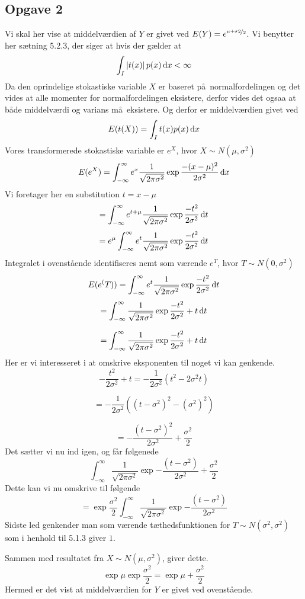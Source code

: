 \subsection{Opgave 2}
Vi skal her vise at middelv\ae rdien af $Y$ er givet ved $E(Y) = e^{\nicefrac{\mu+\sigma2}{2}}$. Vi benytter her s\ae tning 5.2.3, der siger at hvis der g\ae lder at
\[
\int_{I} \left|t(x)\right|p(x) \, \mathrm{d} x < \infty
\]
Da den oprindelige stokastiske variable $X$ er baseret p\aa\ normalfordelingen og det vides at alle momenter for normalfordelingen eksistere, derfor vides det ogsaa at b\aa de middelv\ae rdi og varians m\aa\ eksistere. Og derfor er middelv\ae rdien givet ved
\[
E(t(X)) = \int_{I} t(x)p(x) \, \mathrm{d} x
\]
Vores transformerede stokastiske variable er $e^{X}$, hvor $X \sim N(\mu, \sigma^{2})$
\[
E(e^{X}) = \int_{-\infty}^{\infty} e^{x} \frac{1}{\sqrt{2\pi\sigma^{2}}} \exp{\frac{-(x - \mu)^{2}}{2\sigma^{2}}} \, \mathrm{d} x
\]
Vi foretager her en substitution $t = x - \mu$
\[
= \int_{-\infty}^{\infty} e^{t+\mu} \frac{1}{\sqrt{2\pi\sigma^{2}}} \exp{\frac{-t^{2}}{2\sigma^{2}}} \, \mathrm{d} t
\]
\[
= e^{\mu} \int_{-\infty}^{\infty} e^{t} \frac{1}{\sqrt{2\pi\sigma^{2}}} \exp{\frac{-t^{2}}{2\sigma^{2}}} \, \mathrm{d} t
\]
Integralet i ovenst\aa ende identifiseres nemt som v\ae rende $e^{T}$, hvor $T \sim N(0, \sigma^{2})$
\[
E(e^(T)) = \int_{-\infty}^{\infty} e^{t} \frac{1}{\sqrt{2\pi\sigma^{2}}} \exp{\frac{-t^{2}}{2\sigma^{2}}} \, \mathrm{d} t
\]
\[
= \int_{-\infty}^{\infty} \frac{1}{\sqrt{2\pi\sigma^{2}}} \exp{\frac{-t^{2}}{2\sigma^{2}}+t} \, \mathrm{d} t
\]

\[
= \int_{-\infty}^{\infty} \frac{1}{\sqrt{2\pi\sigma^{2}}} \exp{\frac{-t^{2}}{2\sigma^{2}}+t} \, \mathrm{d} t
\]
Her er vi interesseret i at omskrive eksponenten til noget vi kan genkende.
\[
- \frac{t^2}{2\sigma^2}+t = - \frac{1}{2\sigma^2}\left( t^2-2\sigma^2t \right)
\]

\[
= - \frac{1}{2\sigma^2}\left( \left( t - \sigma^2 \right)^2 - \left(\sigma^2 \right)^2 \right)
\]

\[
= - \frac{\left( t-\sigma^2 \right)^2}{2\sigma^2} + \frac{\sigma^2}{2}
\] 
Det s\ae tter vi nu ind igen, og f\aa r f\o lgenede
\[
\int_{-\infty}^{\infty} \frac{1}{\sqrt{2\pi\sigma^{2}}} \exp{-\frac{(t-\sigma^2)}{2\sigma^2}+\frac{\sigma^2}{2}}
\]
Dette kan vi nu omskrive til f\o lgende
\[
= \exp{\frac{\sigma^2}{2}} \int_{-\infty}^{\infty} \frac{1}{\sqrt{2\pi\sigma^{2}}} \exp{-\frac{(t-\sigma^2)}{2\sigma^2}}
\]
Sidste led genkender man som v\ae rende t\ae thedsfunktionen for $T \sim N(\sigma^2,\sigma^2)$ som i henhold til 5.1.3 giver $1$.

Sammen med resultatet fra $X \sim N(\mu, \sigma^2)$, giver dette.
\[
\exp{\mu} \exp{\frac{\sigma^2}{2}} = \exp{\mu + \frac{\sigma^2}{2}}
\]
Hermed er det vist at middelv\ae rdien for $Y$ er givet ved ovenst\aa ende.


